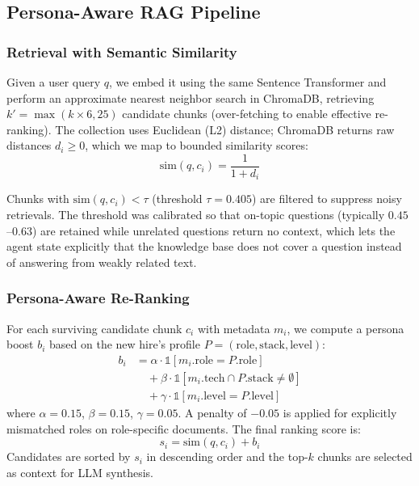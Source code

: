 \documentclass[conference]{IEEEtran}
\begin{document}
\subsection{Persona-Aware RAG Pipeline}

\subsubsection{Retrieval with Semantic Similarity}
Given a user query $q$, we embed it using the same Sentence Transformer and perform an approximate nearest neighbor search in ChromaDB, retrieving $k' = \max(k \times 6, 25)$ candidate chunks (over-fetching to enable effective re-ranking). The collection uses Euclidean (L2) distance; ChromaDB returns raw distances $d_i \geq 0$, which we map to bounded similarity scores:
\begin{equation}
\text{sim}(q, c_i) = \frac{1}{1 + d_i}
\label{eq:l2_sim}
\end{equation}

Chunks with $\text{sim}(q, c_i) < \tau$ (threshold $\tau = 0.405$) are filtered to suppress noisy retrievals. The threshold was calibrated so that on-topic questions (typically $0.45$--$0.63$) are retained while unrelated questions return no context, which lets the agent state explicitly that the knowledge base does not cover a question instead of answering from weakly related text.

\subsubsection{Persona-Aware Re-Ranking}
For each surviving candidate chunk $c_i$ with metadata $m_i$, we compute a persona boost $b_i$ based on the new hire's profile $P = (\text{role}, \text{stack}, \text{level})$:
\begin{equation}
\begin{split}
b_i &= \alpha \cdot \mathbb{1}[m_i.\text{role} = P.\text{role}] \\
    &\quad + \beta \cdot \mathbb{1}[m_i.\text{tech} \cap P.\text{stack} \neq \emptyset] \\
    &\quad + \gamma \cdot \mathbb{1}[m_i.\text{level} = P.\text{level}]
\end{split}
\label{eq:persona_boost}
\end{equation}
where $\alpha = 0.15$, $\beta = 0.15$, $\gamma = 0.05$. A penalty of $-0.05$ is applied for explicitly mismatched roles on role-specific documents. The final ranking score is:
\begin{equation}
s_i = \text{sim}(q, c_i) + b_i
\end{equation}
Candidates are sorted by $s_i$ in descending order and the top-$k$ chunks are selected as context for LLM synthesis.
\end{document}

